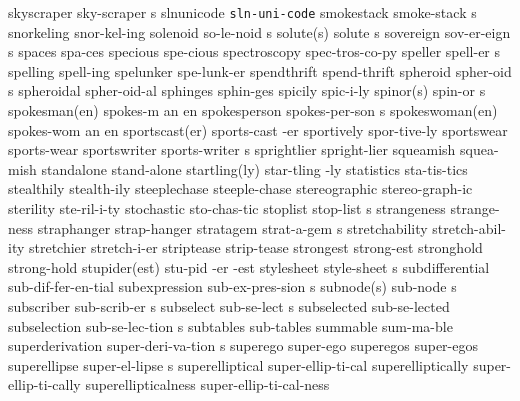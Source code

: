 \5 skyscraper		sky-scraper s
\1 slnunicode		{\tt sln-uni-code}	%
\5 smokestack		smoke-stack s
\1 snorkeling		snor-kel-ing
\5 solenoid		so-le-noid s
\2 solute(s)		solute s
\5 sovereign		sov-er-eign s
\1 spaces		spa-ces
\1 specious		spe-cious
\NewWordtrue
\1 spectroscopy 	spec-tros-co-py		%
\5 speller		spell-er s		%
\1 spelling		spell-ing		%
\1 spelunker		spe-lunk-er
\1 spendthrift		spend-thrift
\5 spheroid		spher-oid s
\1 spheroidal		spher-oid-al
\1 sphinges		sphin-ges
\1 spicily		spic-i-ly
\2 spinor(s)		spin-or s
\3 spokesman(en)	spokes-m an en		%
\5 spokesperson		spokes-per-son s	%
\3 spokeswoman(en)	spokes-wom an en
\2 sportscast(er)	sports-cast -er
\1 sportively		spor-tive-ly
\1 sportswear		sports-wear
\5 sportswriter		sports-writer s
\1 sprightlier		spright-lier
\1 squeamish		squea-mish
\1 standalone		stand-alone
\2 startling(ly)	star-tling -ly
\1 statistics		sta-tis-tics
\1 stealthily		stealth-ily
\1 steeplechase		steeple-chase
\1 stereographic	stereo-graph-ic		%
\NewWordtrue
\1 sterility		ste-ril-i-ty		%
\1 stochastic		sto-chas-tic
\NewWordtrue
\5 stoplist		stop-list s	%
\1 strangeness		strange-ness
\1 straphanger		strap-hanger		%
\5 stratagem		strat-a-gem s
\NewWordtrue
\1 stretchability	stretch-abil-ity	%
\1 stretchier		stretch-i-er
\1 striptease		strip-tease		%
\1 strongest		strong-est
\1 stronghold		strong-hold
\3 stupider(est)	stu-pid -er -est
\NewWordtrue
\5 stylesheet		style-sheet s		%
\1 subdifferential	sub-dif-fer-en-tial	%
\5 subexpression	sub-ex-pres-sion s	%
\2 subnode(s)		sub-node s		%
\5 subscriber 		sub-scrib-er s
\NewWordtrue
\5 subselect		sub-se-lect s		%
\NewWordtrue
\1 subselected  	sub-se-lected	 	%
\NewWordtrue
\5 subselection 	sub-se-lec-tion s 	%
\1 subtables		sub-tables		%
\1 summable		sum-ma-ble
\5 superderivation	super-deri-va-tion s	%
\1 superego		super-ego
\1 superegos		super-egos
\NewWordtrue
\5 superellipse		super-el-lipse s	%
\NewWordtrue
\1 superelliptical	super-ellip-ti-cal	%
\NewWordtrue
\1 superelliptically	super-ellip-ti-cally	%
\NewWordtrue
\1 superellipticalness	super-ellip-ti-cal-ness %

